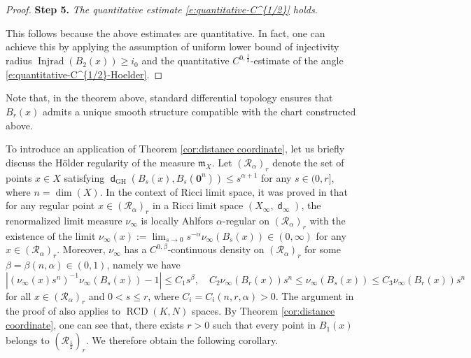 \documentclass[11pt,reqno]{amsart}
\theoremstyle{definition}
\numberwithin{equation}{section}
\newcommand{\bo}{\bm{0}}
\newcommand{\cR}{\mathcal{R}}
\newcommand{\meas}{\mathfrak{m}}
\DeclareMathOperator{\dist}{\mathsf{d}}
\DeclareMathOperator{\Injrad}{Injrad}
\DeclareMathOperator{\RCD}{RCD}
\begin{document}
\begin{proof}
\smallskip

\textbf{Step 5.} \textit{The  quantitative  estimate \eqref{e:quantitative-C^{1/2}} holds.} 

\smallskip

This follows because the above estimates are quantitative.  In fact, one can achieve this by applying the assumption of uniform lower bound of injectivity radius $\Injrad(B_2(x)) \geq i_0 $  and the quantitative $C^{0,\frac{1}{2}}$-estimate of the angle \eqref{e:quantitative-C^{1/2}-Hoelder}.  
\end{proof}
Note that, in the theorem above,   standard  differential topology ensures that $B_r(x)$ admits a unique smooth structure compatible with the chart constructed above.



To introduce an application of Theorem \ref{cor:distance coordinate}, let us briefly discuss the H\"older regularity of the measure $\meas_X$. 
Let $(\cR_{\alpha})_r$ denote the set of points $x \in X$ satisfying
$
\dist_{\mathrm{GH}} (B_s(x), B_s(\bo^n)) \leq s^{\alpha + 1}$ for any $s\in (0,r]$,
where $n  = \dim(X)$. In the context of Ricci limit space, it was proved in \cite[Theorem 4.6]{Cheeger-Colding-III} that for any regular point $x \in (\cR_{\alpha})_r$
in a Ricci limit space $(X_{\infty}, \dist_{\infty})$, the renormalized limit measure $\nu_{\infty}$ is locally Ahlfors $\alpha$-regular on $(\cR_{\alpha})_r$ with the existence of the limit $\nu_{\infty}(x):=\lim_{s\to 0}s^{-\alpha}\nu_{\infty}(B_s(x))\in (0, \infty)$ for any $x \in (\cR_{\alpha})_r$. Moreover, $\nu_{\infty}$ has a $C^{0,\beta}$-continuous  density  on $(\cR_{\alpha})_r$ for some $\beta = \beta(n , \alpha) \in (0,1)$, namely we have 
\begin{equation}\label{ccahlfors}
|(\nu_{\infty}(x)s^{n})^{-1}\nu_{\infty}(B_s(x))-1| \le C_1s^{\beta},\quad C_2 \nu_{\infty}(B_r(x))s^n\le\nu_{\infty}(B_s(x))\le C_3\nu_{\infty}(B_r(x))s^n      
\end{equation}
for all $x \in (\cR_{\alpha})_r$ and $0<s \le r$,
where $C_i=C_i(n, r, \alpha)>0$.
The argument in the proof of \cite[Theorem 4.6]{Cheeger-Colding-III} also applies to $\RCD(K, N)$ spaces. By Theorem \ref{cor:distance coordinate}, one can see that, there exists $r > 0$ such that every point in $B_1(x)$ belongs to $( \cR_{\frac{1}{2}} )_r$. We therefore obtain the following corollary. 
\end{document}
